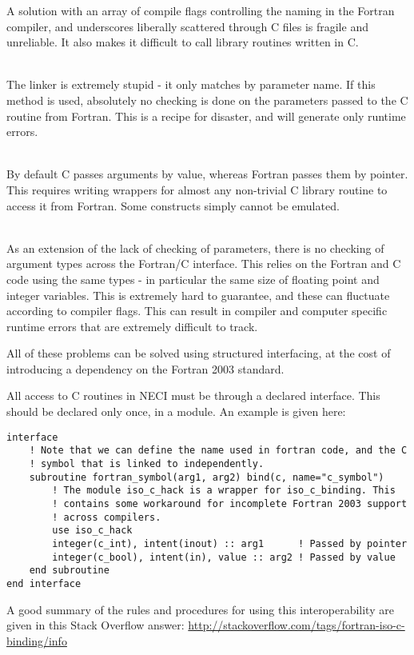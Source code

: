 \documentclass[a4paper,notitlepage]{scrreprt}
\newcommand\headitem[1]{\needspace{1.5\baselineskip}\item[{\boldmath #1 \nopagebreak}] \hfill \\ \nopagebreak}
\begin{document}
{{{\begin{description}
		A solution with an array of compile flags controlling the naming in the
		Fortran compiler, and underscores liberally scattered through C files
		is fragile and unreliable. It also makes it difficult to call library
		routines written in C.

	\headitem{No checking of parameters}
		The linker is extremely stupid - it only matches by parameter name. If
		this method is used, absolutely no checking is done on the parameters
		passed to the C routine from Fortran. This is a recipe for disaster,
		and will generate only runtime errors.

	\headitem{Calling}
		By default C passes arguments by value, whereas Fortran passes them
		by pointer. This requires writing wrappers for almost any non-trivial
		C library routine to access it from Fortran. Some constructs simply
		cannot be emulated.

	\headitem{Variable types}
		As an extension of the lack of checking of parameters, there is no
		checking of argument types across the Fortran/C interface. This relies
		on the Fortran and C code using the same types - in particular the
		same size of floating point and integer variables. This is extremely
		hard to guarantee, and these can fluctuate according to compiler flags.
		This can result in compiler and computer specific runtime errors that
		are extremely difficult to track.
\end{description}
All of these problems can be solved using structured interfacing, at the cost
of introducing a dependency on the Fortran 2003 standard.

All access to C routines in NECI must be through a declared interface. This
should be declared only once, in a module. An example is given here:
\begin{lstlisting}
interface
	! Note that we can define the name used in fortran code, and the C
	! symbol that is linked to independently.
	subroutine fortran_symbol(arg1, arg2) bind(c, name="c_symbol")
		! The module iso_c_hack is a wrapper for iso_c_binding. This
		! contains some workaround for incomplete Fortran 2003 support
		! across compilers.
		use iso_c_hack
		integer(c_int), intent(inout) :: arg1      ! Passed by pointer
		integer(c_bool), intent(in), value :: arg2 ! Passed by value
	end subroutine
end interface
\end{lstlisting}
A good summary of the rules and procedures for using this interoperability are
given in this Stack Overflow answer:
\url{http://stackoverflow.com/tags/fortran-iso-c-binding/info}

}}}
\end{document}
